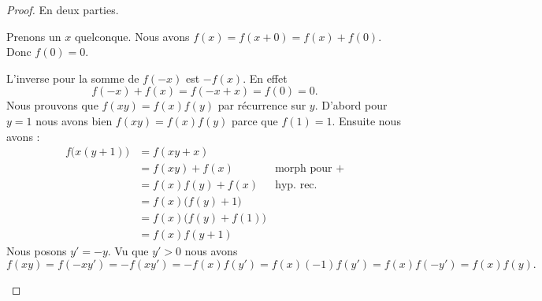 \begin{proof}
	En deux parties.
	\begin{subproof}
		Prenons un \( x\) quelconque. Nous avons \( f(x)= f(x+0)=f(x)+f(0)\). Donc \( f(0)=0\).

		L'inverse pour la somme de \( f(-x)\) est \( -f(x)\). En effet
		\begin{equation}
			f(-x)+f(x)=f(-x+x)=f(0)=0.
		\end{equation}
		Nous prouvons que \( f(xy)=f(x)f(y)\) par récurrence sur \( y\). D'abord pour \( y=1\) nous avons bien \( f(xy)=f(x)f(y)\) parce que \( f(1)=1\). Ensuite nous avons :
		\begin{subequations}
			\begin{align}
				f\big( x(y+1) \big) & =f(xy+x)                                         \\
				                    & =f(xy)+f(x)                & \text{morph pour +} \\
				                    & =f(x)f(y)+f(x)             & \text{hyp. rec.}    \\
				                    & =f(x)\big( f(y)+1 \big)                          \\
				                    & =f(x)\big( f(y)+f(1) \big)                       \\
				                    & =f(x)f(y+1)
			\end{align}
		\end{subequations}
		\spitem[Si \( y<0\)]
		Nous posons \( y'=-y\). Vu que \( y'>0\) nous avons
		\begin{equation}
			f(xy)=f(-xy')=-f(xy')=-f(x)f(y')=f(x)(-1)f(y')=f(x)f(-y')=f(x)f(y).
		\end{equation}
	\end{subproof}
\end{proof}
